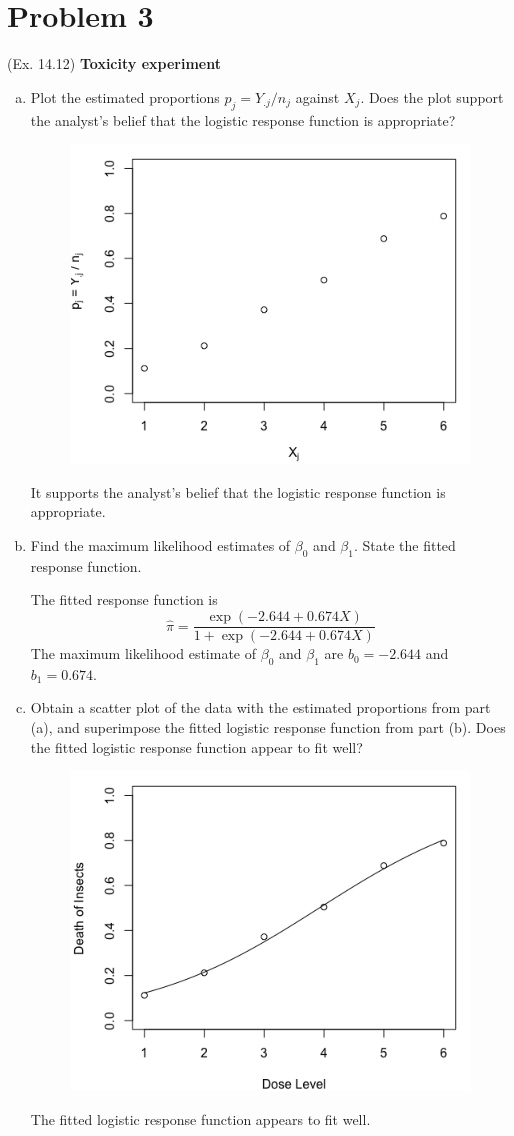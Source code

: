 \documentclass[10pt]{report}
\begin{document}
\section*{Problem 3}
(Ex. 14.12) \textbf{Toxicity experiment}
\begin{enumerate}[a.]
	\item 
	Plot the estimated proportions $p_j = Y_{.j} / n_j$ against $X_j$. Does the plot support the analyst's belief that the logistic response function is appropriate?
	\begin{figure}[H]
		\centering
		\includegraphics[width=.5\linewidth]{p3/12a.png}
	\end{figure}
	It supports the analyst's belief that the logistic response function is appropriate.
	
	\item 
	Find the maximum likelihood estimates of $\beta_0$ and $\beta_1$. State the fitted response function.
	
	The fitted response function is 
	\[
	\hat{\pi} = \frac{\exp(-2.644 + 0.674X)}{1 + \exp(-2.644 + 0.674X)}
	\]
	The maximum likelihood estimate of $\beta_0$ and $\beta_1$ are $b_0 = -2.644$ and $b_1 = 0.674$.
	
	\item 
	Obtain a scatter plot of the data with the estimated proportions from part (a), and superimpose the fitted logistic response function from part (b). Does the fitted logistic response function appear to fit well?
	\begin{figure}[H]
		\centering
		\includegraphics[width=.5\linewidth]{p3/12c.png}
	\end{figure}
	The fitted logistic response function appears to fit well.
	

\end{enumerate}
\end{document}
